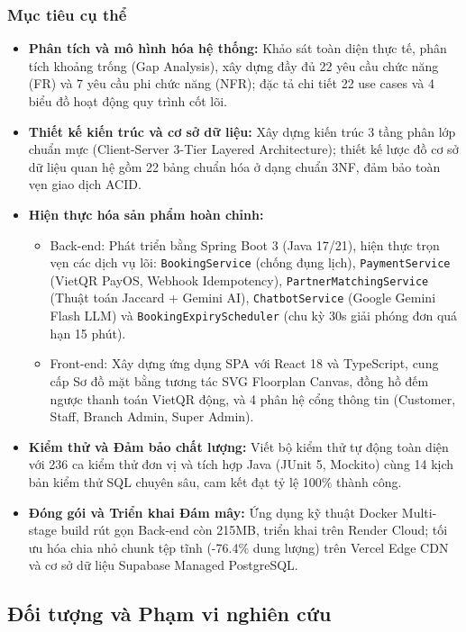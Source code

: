 \subsubsection{Mục tiêu cụ thể}
\begin{itemize}
    \item \textbf{Phân tích và mô hình hóa hệ thống:} Khảo sát toàn diện thực tế, phân tích khoảng trống (Gap Analysis), xây dựng đầy đủ 22 yêu cầu chức năng (FR) và 7 yêu cầu phi chức năng (NFR); đặc tả chi tiết 22 use cases và 4 biểu đồ hoạt động quy trình cốt lõi.
    \item \textbf{Thiết kế kiến trúc và cơ sở dữ liệu:} Xây dựng kiến trúc 3 tầng phân lớp chuẩn mực (Client-Server 3-Tier Layered Architecture); thiết kế lược đồ cơ sở dữ liệu quan hệ gồm 22 bảng chuẩn hóa ở dạng chuẩn 3NF, đảm bảo toàn vẹn giao dịch ACID.
    \item \textbf{Hiện thực hóa sản phẩm hoàn chỉnh:}
    \begin{itemize}
        \item Back-end: Phát triển bằng Spring Boot 3 (Java 17/21), hiện thực trọn vẹn các dịch vụ lõi: \texttt{BookingService} (chống đụng lịch), \texttt{PaymentService} (VietQR PayOS, Webhook Idempotency), \texttt{PartnerMatchingService} (Thuật toán Jaccard + Gemini AI), \texttt{ChatbotService} (Google Gemini Flash LLM) và \texttt{BookingExpiryScheduler} (chu kỳ 30s giải phóng đơn quá hạn 15 phút).
        \item Front-end: Xây dựng ứng dụng SPA với React 18 và TypeScript, cung cấp Sơ đồ mặt bằng tương tác SVG Floorplan Canvas, đồng hồ đếm ngược thanh toán VietQR động, và 4 phân hệ cổng thông tin (Customer, Staff, Branch Admin, Super Admin).
    \end{itemize}
    \item \textbf{Kiểm thử và Đảm bảo chất lượng:} Viết bộ kiểm thử tự động toàn diện với 236 ca kiểm thử đơn vị và tích hợp Java (JUnit 5, Mockito) cùng 14 kịch bản kiểm thử SQL chuyên sâu, cam kết đạt tỷ lệ 100\% thành công.
    \item \textbf{Đóng gói và Triển khai Đám mây:} Ứng dụng kỹ thuật Docker Multi-stage build rút gọn Back-end còn 215MB, triển khai trên Render Cloud; tối ưu hóa chia nhỏ chunk tệp tĩnh (-76.4\% dung lượng) trên Vercel Edge CDN và cơ sở dữ liệu Supabase Managed PostgreSQL.
\end{itemize}

\subsection{Đối tượng và Phạm vi nghiên cứu}

